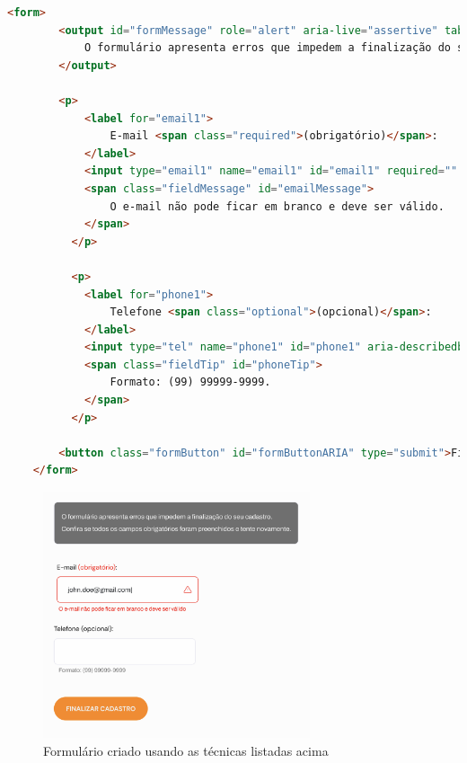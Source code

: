 {\begin{itemize}
    {\begin{lstlisting}[language=html, caption=Formulário acessível]
    <form>
        <output id="formMessage" role="alert" aria-live="assertive" tabindex="0" class="error">
            O formulário apresenta erros que impedem a finalização do seu cadastro. Confira se todos os campos obrigatórios foram preenchidos e tente novamente.
        </output>

        <p>
            <label for="email1">
                E-mail <span class="required">(obrigatório)</span>:
            </label>
            <input type="email1" name="email1" id="email1" required="" aria-invalid="true" aria-describedby="emailMessage">
            <span class="fieldMessage" id="emailMessage">
                O e-mail não pode ficar em branco e deve ser válido.
            </span>
          </p>
  
          <p>
            <label for="phone1">
                Telefone <span class="optional">(opcional)</span>:
            </label>
            <input type="tel" name="phone1" id="phone1" aria-describedby="phoneTip">
            <span class="fieldTip" id="phoneTip">
                Formato: (99) 99999-9999.
            </span>
          </p>

        <button class="formButton" id="formButtonARIA" type="submit">Finalizar cadastro</button>
    </form>
    \end{lstlisting}}
    
    \begin{figure}[ht]
  		\center
        \includegraphics[width=0.7\textwidth]{images/form-acessivel.png}
        \caption{Formulário criado usando as técnicas listadas acima}
    \end{figure} 
\end{itemize}
}
